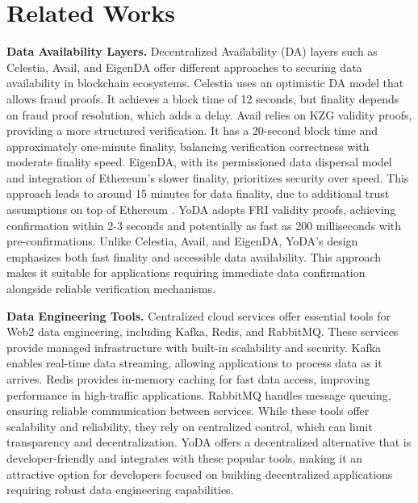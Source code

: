 \documentclass[11pt]{article}
\begin{document}
\section{Related Works}
\textbf{Data Availability Layers.} Decentralized Availability (DA) layers such as Celestia, Avail, and EigenDA offer different approaches to securing data availability in blockchain ecosystems. Celestia uses an optimistic DA model that allows fraud proofs. It achieves a block time of 12 seconds, but finality depends on fraud proof resolution, which adds a delay. Avail relies on KZG validity proofs, providing a more structured verification. It has a 20-second block time and approximately one-minute finality, balancing verification correctness with moderate finality speed. EigenDA, with its permissioned data dispersal model and integration of Ethereum’s slower finality, prioritizes security over speed. This approach leads to around 15 minutes for data finality, due to additional trust assumptions on top of Ethereum \cite{avail_dal_guide}. YoDA adopts FRI validity proofs, achieving confirmation within 2-3 seconds and potentially as fast as 200 milliseconds with pre-confirmations. Unlike Celestia, Avail, and EigenDA, YoDA’s design emphasizes both fast finality and accessible data availability. This approach makes it suitable for applications requiring immediate data confirmation alongside reliable verification mechanisms.

\textbf{Data Engineering Tools.} Centralized cloud services offer essential tools for Web2 data engineering, including Kafka, Redis, and RabbitMQ. These services provide managed infrastructure with built-in scalability and security. Kafka enables real-time data streaming, allowing applications to process data as it arrives. Redis provides in-memory caching for fast data access, improving performance in high-traffic applications. RabbitMQ handles message queuing, ensuring reliable communication between services. While these tools offer scalability and reliability, they rely on centralized control, which can limit transparency and decentralization. YoDA offers a decentralized alternative that is developer-friendly and integrates with these popular tools, making it an attractive option for developers focused on building decentralized applications requiring robust data engineering capabilities.
\end{document}
